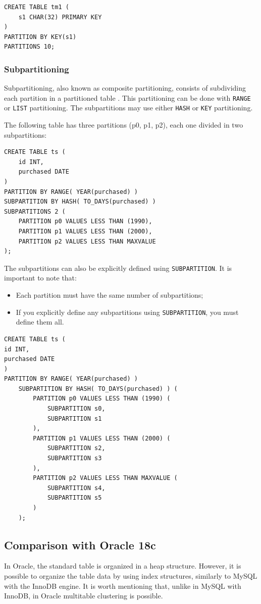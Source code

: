 \documentclass[12pt]{article}
\begin{document}
\begin{verbatim}
CREATE TABLE tm1 (
    s1 CHAR(32) PRIMARY KEY
)
PARTITION BY KEY(s1)
PARTITIONS 10;
\end{verbatim}


\subsubsection{Subpartitioning}
Subpartitioning, also known as composite partitioning, consists of subdividing each partition in a partitioned table \parencite{SUBPARTITIONING}. 
This partitioning can be done with \verb|RANGE| or \verb|LIST| partitioning. The subpartitions may use either \verb|HASH| or \verb|KEY| partitioning.

The following table has three partitions (p0, p1, p2), each one divided in two subpartitions:
\begin{verbatim}
CREATE TABLE ts (
    id INT,
    purchased DATE
)
PARTITION BY RANGE( YEAR(purchased) )
SUBPARTITION BY HASH( TO_DAYS(purchased) )
SUBPARTITIONS 2 (
    PARTITION p0 VALUES LESS THAN (1990),
    PARTITION p1 VALUES LESS THAN (2000),
    PARTITION p2 VALUES LESS THAN MAXVALUE
);
\end{verbatim}

The subpartitions can also be explicitly defined using \verb|SUBPARTITION|. It is important to note that:
\begin{itemize}
    \item Each partition must have the same number of subpartitions;
    \item If you explicitly define any subpartitions using \verb|SUBPARTITION|, you must define them all.
\end{itemize}

\begin{verbatim}
CREATE TABLE ts (
id INT,
purchased DATE
)
PARTITION BY RANGE( YEAR(purchased) )
    SUBPARTITION BY HASH( TO_DAYS(purchased) ) (
        PARTITION p0 VALUES LESS THAN (1990) (
            SUBPARTITION s0,
            SUBPARTITION s1
        ),
        PARTITION p1 VALUES LESS THAN (2000) (
            SUBPARTITION s2,
            SUBPARTITION s3
        ),
        PARTITION p2 VALUES LESS THAN MAXVALUE (
            SUBPARTITION s4,
            SUBPARTITION s5
        )
    );
\end{verbatim}



\subsection{Comparison with Oracle 18c}
\label{storageComp} 
In Oracle, the standard table is organized in a heap structure. However, it is possible to organize the table data by using index structures, similarly to MySQL with the InnoDB engine. It is worth mentioning that, unlike in MySQL with InnoDB, in Oracle multitable clustering is possible.
\end{document}
